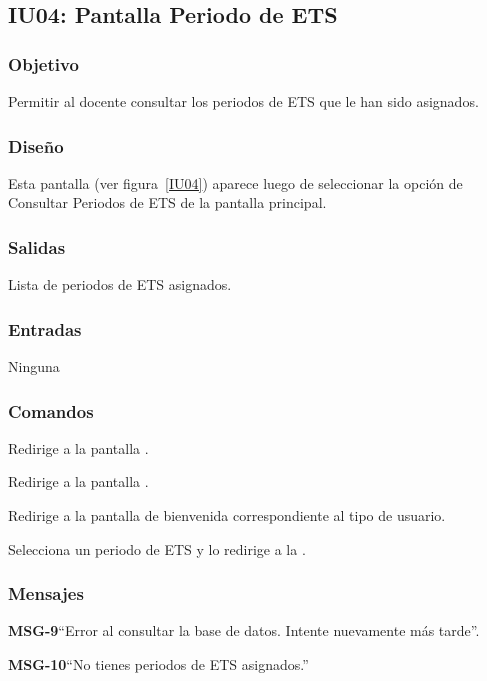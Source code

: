 \subsection{IU04: Pantalla Periodo de ETS}

\subsubsection{Objetivo}
	Permitir al docente consultar los periodos de ETS que le han sido asignados. 

\subsubsection{Diseño}
	Esta pantalla  (ver figura~\ref{IU04}) aparece luego de seleccionar la opción de Consultar Periodos de ETS de la pantalla principal. 


\subsubsection{Salidas}

	Lista de periodos de ETS asignados. 

\subsubsection{Entradas}
Ninguna

\subsubsection{Comandos}

\begin{Citemize}
	\item {} Redirige a la pantalla .
	\item {} Redirige a la pantalla .
	\item {} Redirige a la pantalla de bienvenida correspondiente al tipo de usuario.
	\item {} Selecciona un periodo de ETS y lo redirige a la . 
\end{Citemize}


\subsubsection{Mensajes}

\begin{Citemize}
	\item {\bf MSG-9}{``Error al consultar la base de datos. Intente nuevamente más tarde''.}
	\item {\bf MSG-10}{``No tienes periodos de ETS asignados.''}
\end{Citemize}

